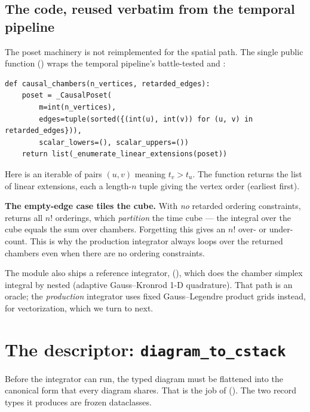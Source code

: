 \subsection{The code, reused verbatim from the temporal pipeline}

The poset machinery is not reimplemented for the spatial path. The single public
function () wraps the temporal pipeline's
battle-tested  and :

\begin{lstlisting}
def causal_chambers(n_vertices, retarded_edges):
    poset = _CausalPoset(
        m=int(n_vertices),
        edges=tuple(sorted({(int(u), int(v)) for (u, v) in retarded_edges})),
        scalar_lowers=(), scalar_uppers=())
    return list(_enumerate_linear_extensions(poset))
\end{lstlisting}

Here  is an iterable of pairs $(u,v)$ meaning $t_v > t_u$.
The function returns the list of linear extensions, each a length-$n$ tuple giving
the vertex order (earliest first).

\begin{gotcha}
\textbf{The empty-edge case tiles the cube.} With \emph{no} retarded ordering
constraints,  returns all $n!$ orderings, which
\emph{partition} the time cube --- the integral over the cube equals the sum over
chambers. Forgetting this gives an $n!$ over- or under-count. This is why the
production integrator always loops over the returned chambers even when there are
no ordering constraints.
\end{gotcha}

The module also ships a reference integrator, 
(), which does the chamber simplex integral by nested
 (adaptive Gauss--Kronrod 1-D quadrature). That path is
an oracle; the \emph{production} integrator uses fixed Gauss--Legendre product
grids instead, for vectorization, which we turn to next.

\section{The descriptor: \texorpdfstring{\texttt{diagram\_to\_cstack}}{diagram\_to\_cstack}}\label{sec:descriptor}

Before the integrator can run, the typed diagram must be flattened into the
canonical  form that every diagram shares. That is the job of
 (). The two record
types it produces are frozen dataclasses.

